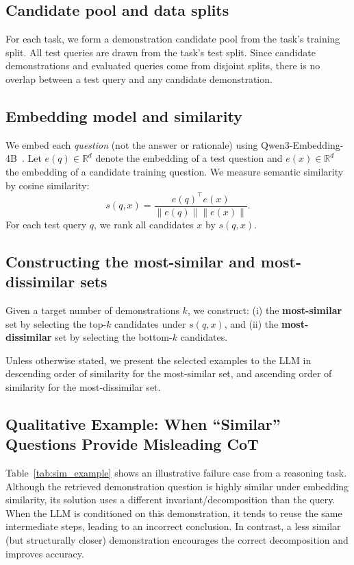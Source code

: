 \documentclass{llmxive}
\begin{document}
\subsection{Candidate pool and data splits}
For each task, we form a demonstration candidate pool from the task's training split. All test queries are drawn from the task's test split.  Since candidate demonstrations and evaluated queries come from disjoint splits, there is no overlap between a test query and any candidate demonstration.

\subsection{Embedding model and similarity}
We embed each \emph{question} (not the answer or rationale) using Qwen3-Embedding-4B~\cite{zhang2025qwen3embeddingadvancingtext}.
Let $e(q)\in\mathbb{R}^d$ denote the embedding of a test question and $e(x)\in\mathbb{R}^d$ the embedding of a candidate training question.
We measure semantic similarity by cosine similarity:
\[
s(q,x) = \frac{e(q)^\top e(x)}{\|e(q)\|\|e(x)\|}.
\]
For each test query $q$, we rank all candidates $x$ by $s(q,x)$.

\subsection{Constructing the most-similar and most-dissimilar sets}
Given a target number of demonstrations $k$, we construct:
(i) the \textbf{most-similar} set by selecting the top-$k$ candidates under $s(q,x)$, and
(ii) the \textbf{most-dissimilar} set by selecting the bottom-$k$ candidates.

Unless otherwise stated, we present the selected examples to the LLM in descending order of similarity for the most-similar set, and ascending order of similarity for the most-dissimilar set.


\subsection{Qualitative Example: When ``Similar'' Questions Provide Misleading CoT}
\label{sec:sim_qual}

Table~\ref{tab:sim_example} shows an illustrative failure case from a reasoning task.
Although the retrieved demonstration question is highly similar under embedding similarity, its solution uses a different invariant/decomposition than the query.
When the LLM is conditioned on this demonstration, it tends to reuse the same intermediate steps, leading to an incorrect conclusion.
In contrast, a less similar (but structurally closer) demonstration encourages the correct decomposition and improves accuracy.
\end{document}
